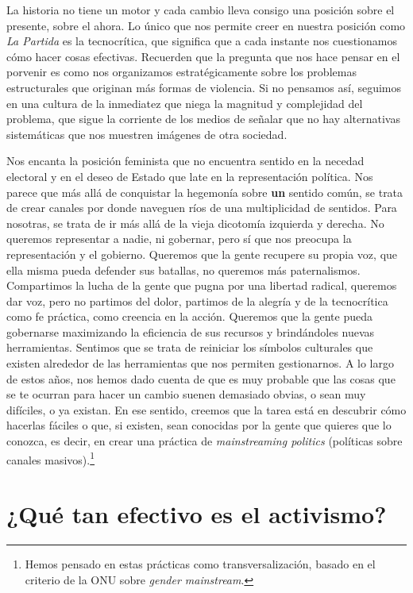 La historia no tiene un motor y cada cambio lleva consigo una posición sobre el presente, sobre el ahora. Lo único que nos permite creer en nuestra posición como \emph{La Partida} es la tecnocrítica, que significa que a cada instante nos cuestionamos cómo hacer cosas efectivas. Recuerden que la pregunta que nos hace pensar en el porvenir es como nos organizamos estratégicamente sobre los problemas estructurales que originan más formas de violencia. Si no pensamos así, seguimos en una cultura de la inmediatez que niega la magnitud y complejidad del problema, que sigue la corriente de los medios de señalar que no hay alternativas sistemáticas que nos muestren imágenes de otra sociedad.

Nos encanta la posición feminista que no encuentra sentido en la necedad electoral y en el deseo de Estado que late en la representación política. Nos parece que más allá de conquistar la hegemonía sobre \textbf{un} sentido común, se trata de crear canales por donde naveguen ríos de una multiplicidad de sentidos. Para nosotras, se trata de ir más allá de la vieja dicotomía izquierda y derecha. No queremos representar a nadie, ni gobernar, pero sí que nos preocupa la representación y el gobierno. Queremos que la gente recupere su propia voz, que ella misma pueda defender sus batallas, no queremos más paternalismos. Compartimos la lucha de la gente que pugna por una libertad radical, queremos dar voz, pero no partimos del dolor, partimos de la alegría y de la tecnocrítica como fe práctica, como creencia en la acción. Queremos que la gente pueda gobernarse maximizando la eficiencia de sus recursos y brindándoles nuevas herramientas. Sentimos que se trata de reiniciar los símbolos culturales que existen alrededor de las herramientas que nos permiten gestionarnos. A lo largo de estos años, nos hemos dado cuenta de que es muy probable que las cosas que se te ocurran para hacer un cambio suenen demasiado obvias, o sean muy difíciles, o ya existan. En ese sentido, creemos que la tarea está en descubrir cómo hacerlas fáciles o que, si existen, sean conocidas por la gente que quieres que lo conozca, es decir, en crear una práctica de \emph{mainstreaming politics} (políticas sobre canales masivos).\footnote{Hemos pensado en estas prácticas como transversalización, basado en el criterio de la ONU sobre \emph{gender mainstream}.}\addref{}

\section{¿Qué tan efectivo es el activismo?}
\label{sec:activismo}

